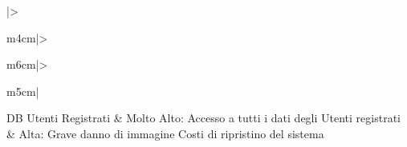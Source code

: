 \begin{center}
\begin{adjustwidth}{-1.8cm}{0cm}
{\begin{tabular}{|>\raggedright m{4cm}|>\raggedright m{6cm}|>\raggedright m{5cm}|}
                                \n      DB Utenti Registrati                        &
                                Molto Alto:\newline
                                Accesso a tutti i dati degli Utenti registrati      &
                                Alta:\newline
                                Grave danno di immagine\newline
                                Costi di ripristino del sistema
                                \n
                        \end{tabular}
                }
                \label{tab:monkeytable:monkerisk:valutaBanane}
        \end{adjustwidth}

        \begin{adjustwidth}{-2cm}{0cm}
                \centering
\end{adjustwidth}
\end{center}
